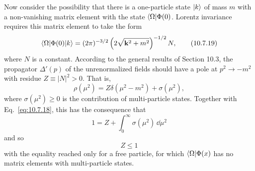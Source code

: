 Now consider the possibility that there is a one-particle state $\lvert k\rangle$ of
mass $m$ with a non-vanishing matrix element with the state
$\langle \Omega\rvert\Phi(0)$. Lorentz invariance requires this matrix element to take
the form
\begin{equation}
  \langle \Omega\rvert\Phi(0)\lvert k\rangle
  =(2\pi)^{-3/2}\left(2\sqrt{\mathbf{k}^2+m^2}\right)^{-1/2}N,
  \tag{10.7.19}\label{eq:10.7.19}
\end{equation}
where $N$ is a constant. According to the general results of Section 10.3,
the propagator $\Delta'(p)$ of the unrenormalized fields should have a pole at
$p^2\to-m^2$ with residue $Z\equiv|N|^2>0$. That is,
\begin{equation}
  \rho(\mu^2)=Z\delta(\mu^2-m^2)+\sigma(\mu^2),
  \tag{10.7.20}\label{eq:10.7.20}
\end{equation}
where $\sigma(\mu^2)\geq0$ is the contribution of multi-particle states.
Together with Eq.~\eqref{eq:10.7.18}, this has the consequence that
\begin{equation}
  1=Z+\int_0^\infty\sigma(\mu^2)\,\dd\mu^2
  \tag{10.7.21}\label{eq:10.7.21}
\end{equation}
and so
\begin{equation}
  Z\leq1
  \tag{10.7.22}\label{eq:10.7.22}
\end{equation}
with the equality reached only for a free particle, for which
$\langle \Omega\rvert\Phi(x)$ has no matrix elements with multi-particle states.

